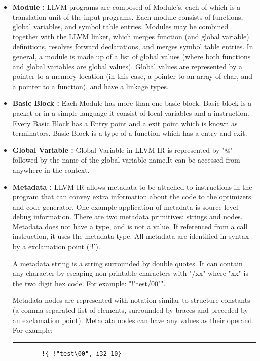\documentclass{book}
\begin{document}
\begin{itemize}
	\item \textbf{Module : } LLVM programs are composed of Module's, each of which is a translation unit of the input programs. Each module consists of functions, global variables, and symbol table entries. Modules may be combined together with the LLVM linker, which merges function (and global variable) definitions, resolves forward declarations, and merges symbol table entries. In general, a module is made up of a list of global values (where both functions and global variables are global values). Global values are represented by a pointer to a memory location (in this case, a pointer to an array of char, and a pointer to a function), and have a linkage types.
	\item \textbf{Basic Block : } Each Module has more than one basic block. Basic block is a packet or in a simple language it consist of local variables and a instruction. Every Basic Block has a Entry point and a exit point which is known as terminators. Basic Block is a type of a function which has a entry and exit.
	\item \textbf{Global Variable : } Global Variable in LLVM IR is represented by "@" followed by the name of the global variable name.It can be accessed from anywhere in the context. 
	\item \textbf{Metadata : }LLVM IR allows metadata to be attached to instructions in the program that can convey extra information about the code to the optimizers and code generator. One example application of metadata is source-level debug information. There are two metadata primitives: strings and nodes.	Metadata does not have a type, and is not a value. If referenced from a call instruction, it uses the metadata type.	All metadata are identified in syntax by a exclamation point (`!').
	
	A metadata string is a string surrounded by double quotes. It can contain any character by escaping non-printable characters with "/xx" where "xx" is the two digit hex code. For example: "!"test/00"".
	
	Metadata nodes are represented with notation similar to structure constants (a comma separated list of elements, surrounded by braces and preceded by an exclamation point). Metadata nodes can have any values as their operand. For example:\newline
	
	\noindent\rule{12cm}{0.4pt}
	
	\begin{verbatim}
		!{ !"test\00", i32 10}
	\end{verbatim}
	

\end{itemize}
\end{document}
